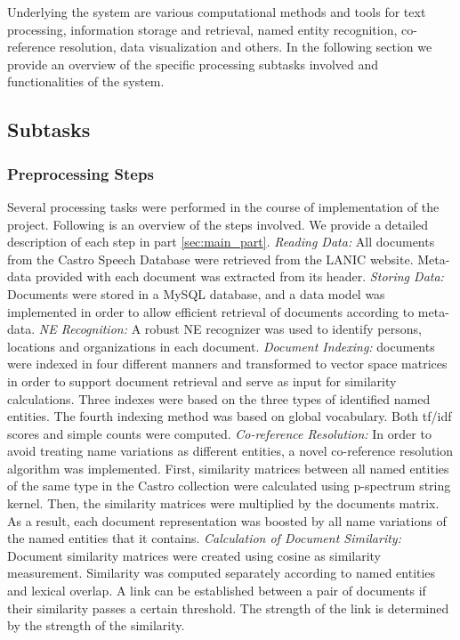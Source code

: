 Underlying the system are various computational methods and tools for text processing, information storage and retrieval, named entity recognition, co-reference resolution, data visualization and others. In the following section we provide an overview of the specific processing subtasks involved and functionalities of the system.

\subsection{Subtasks}
\label{sec:subtasks}
\subsubsection{Preprocessing Steps}
Several processing tasks were performed in the course of implementation of the project. Following is an overview of the steps involved. We provide a  detailed description of each step in part  \ref{sec:main_part}.
\emph{Reading Data:} All documents from the Castro Speech Database were retrieved from the LANIC website. Meta-data provided with each document was extracted from its header. 
\emph{Storing Data:} Documents were stored in a MySQL database, and a data model was implemented in order to allow efficient retrieval of documents according to meta-data. 
\emph{NE Recognition:} A robust NE recognizer was used to identify persons, locations and organizations in each document.
\emph{Document Indexing:} documents were indexed in four different manners and transformed to vector space matrices in order to support document retrieval and serve as input for similarity calculations. Three indexes were based on the three types of identified named entities. The fourth indexing method was based on global vocabulary. Both tf/idf scores and simple counts were computed.
\emph{Co-reference Resolution:} In order to avoid treating name variations as different entities, a novel co-reference resolution algorithm was implemented. First, similarity matrices between all named entities of the same type in the Castro collection were calculated using p-spectrum string kernel. Then, the similarity matrices were multiplied by the documents matrix. As a result, each document representation was boosted by all name variations of the named entities that it contains.
\emph{Calculation of Document Similarity:} Document similarity matrices were created using cosine as similarity measurement. Similarity was computed separately according to named entities and  lexical overlap. A link can be established between a pair of documents if their similarity passes a certain threshold. The strength of the link is determined by the strength of the similarity.

